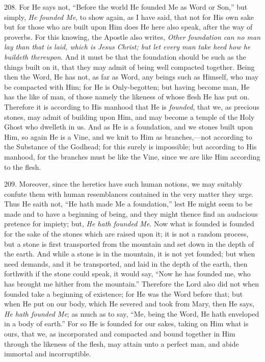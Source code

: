 208. For He says not, ``Before
the world He founded Me as Word or Son,'' but simply, \emph{He founded Me},
to show again, as I have said, that not for His own sake but for those
who are built upon Him does He here also speak, after the way of
proverbs. For this knowing, the Apostle also writes, \emph{Other
foundation can no man lay than that is laid, which is Jesus Christ;
but let every man take heed how he buildeth thereupon}. And it must
be that the foundation should be such as the things built on it, that
they may admit of being well compacted together. Being then the Word,
He has not, as far as Word, any beings such as Himself, who may be
compacted with Him; for He is Only-begotten; but having become man, He
has the like of man, of those namely the likeness of whose flesh He
has put on. Therefore it is according to His manhood that He is \emph{founded},
that we, as precious stones, may admit of building upon Him, and may
become a temple of the Holy Ghost who dwelleth in us. And as He is a
foundation, and we stones built upon Him, so again He is a Vine, and
we knit to Him as branches,—not according to the Substance of the
Godhead; for this surely is impossible; but according to His manhood,
for the branches must be like the Vine, since we are like Him
according to the flesh.

209. Moreover, since the
heretics have such human notions, we may suitably confute them with
human resemblances contained in the very matter they urge. Thus He
saith not, ``He hath made Me a foundation,'' lest He might seem to be
made and to have a beginning of being, and they might thence find an
audacious pretence for impiety; but, \emph{He hath founded Me}. Now
what is founded is founded for the sake of the stones which are raised
upon it; it is not a random process, but a stone is first transported
from the mountain and set down in the depth of the earth. And
while a stone is in the mountain, it is not yet founded; but when need
demands, and it be transported, and laid in the depth of the earth,
then forthwith if the stone could speak, it would say, ``Now he has
founded me, who has brought me hither from the mountain.'' Therefore
the Lord also did not when founded take a beginning of existence; for
He was the Word before that; but when He put on our body, which He
severed and took from Mary, then He says, \emph{He hath founded Me};
as much as to say, ``Me, being the Word, He hath enveloped in a body of
earth.'' For so He is founded for our sakes, taking on Him what is
ours, that we, as incorporated and compacted and bound together in Him
through the likeness of the flesh, may attain unto a perfect man, and
abide immortal and incorruptible.

